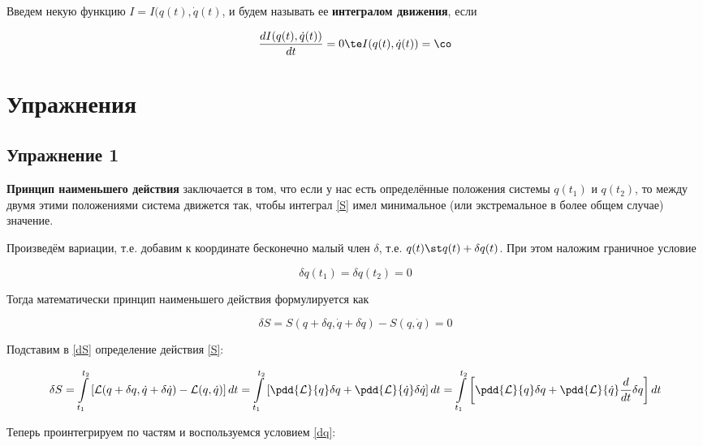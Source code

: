 \documentclass[12pt]{kiarticle}
\newcommand{\Ll}{\ensuremath{\mathcal{L}}}
\begin{document}
Введем некую функцию $ I = I (q(t), \dot{q}(t) $, и будем называть ее \textbf{интегралом движения}, если 

\begin{equation}\label{I}
\dfrac{d I (q(t), \dot{q}(t) )}{dt} = 0 \te I (q(t), \dot{q}(t) ) = \co 
\end{equation}



\section{Упражнения}

\subsection{Упражнение 1}

\textbf{Принцип наименьшего действия} заключается в том, что если у нас есть определённые положения системы $ q(t_1) $ и $ q(t_2) $, то между двумя этими положениями система движется так, чтобы интеграл \eqref{S} имел минимальное (или экстремальное в более общем случае) значение. 

Произведём вариации, т.е. добавим к координате бесконечно малый член $ \delta $, т.е. $ q(t) \st q(t) + \delta q(t) $. При этом наложим граничное условие 

\begin{equation}\label{dq}
\delta q(t_1) = \delta q (t_2) = 0
\end{equation}

Тогда математически принцип наименьшего действия формулируется как

\begin{equation}\label{dS}
\delta S = S(q + \delta q, \dot{q} + \delta \dot{q}) - S (q, \dot{q}) = 0
\end{equation}

Подставим в \eqref{dS} определение действия \eqref{S}: 

\begin{equation}\label{}
 \delta S= \int\limits_{t_1}^{t_2} \left[ \Ll(q + \delta q, \dot{q} + \delta \dot{q})  -  \Ll(q, \dot{q}) \right]  dt = \int\limits_{t_1}^{t_2} \left [ \pdd{\Ll}{q}\delta q + \pdd{\Ll}{\dot{q}}\delta\dot{q} \right ] dt =  \int\limits_{t_1}^{t_2} \left [ \pdd{\Ll}{q}\delta q + \pdd{\Ll}{\dot{q}} \dfrac{d}{dt}\delta q \right ] dt
\end{equation}

Теперь проинтегрируем по частям и воспользуемся условием \eqref{dq}:
\end{document}
